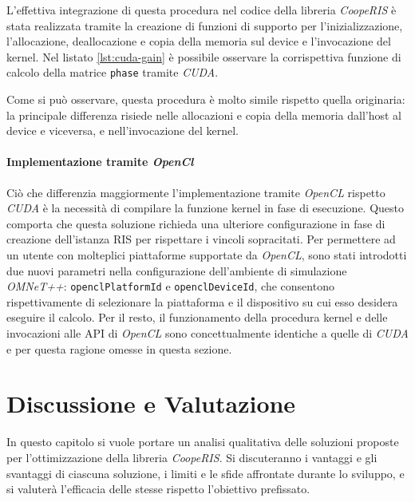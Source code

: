 L'effettiva integrazione di questa procedura nel codice della libreria \textit{CoopeRIS}
è stata realizzata tramite la creazione di funzioni di supporto per l'inizializzazione,
l'allocazione, deallocazione e copia della memoria sul device e l'invocazione
del kernel. Nel listato \ref{lst:cuda-gain} è possibile osservare la corrispettiva
funzione di calcolo della matrice \texttt{phase} tramite \textit{CUDA}.



Come si può osservare, questa procedura è molto simile rispetto quella originaria:
la principale differenza risiede nelle allocazioni e copia della memoria dall'host
al device e viceversa, e nell'invocazione del kernel.

\paragraph{Implementazione tramite \textit{OpenCl}}
\label{para:opencl}

Ciò che differenzia maggiormente l'implementazione tramite \textit{OpenCL}
rispetto \textit{CUDA} è la necessità di compilare la funzione kernel in fase di
esecuzione. Questo comporta che questa soluzione richieda una ulteriore
configurazione in fase di creazione dell'istanza RIS per rispettare i vincoli
sopracitati. Per permettere ad un utente con molteplici piattaforme supportate da
\textit{OpenCL}, sono stati introdotti due nuovi parametri nella configurazione dell'ambiente
di simulazione \textit{OMNeT++}: \texttt{openclPlatformId} e \texttt{openclDeviceId},
che consentono rispettivamente di selezionare la piattaforma e il dispositivo su
cui esso desidera eseguire il calcolo. Per il resto, il funzionamento della
procedura kernel e delle invocazioni alle API di \textit{OpenCL} sono concettualmente
identiche a quelle di \textit{CUDA} e per questa ragione omesse in questa
sezione.

\section{Discussione e Valutazione}
\label{ch:discussione}

In questo capitolo si vuole portare un analisi qualitativa delle soluzioni proposte
per l'ottimizzazione della libreria \textit{CoopeRIS}. Si discuteranno i vantaggi
e gli svantaggi di ciascuna soluzione, i limiti e le sfide affrontate durante lo
sviluppo, e si valuterà l'efficacia delle stesse rispetto l'obiettivo prefissato.


